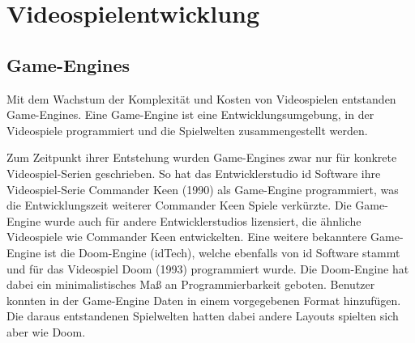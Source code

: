 

\lstset{style=mystyle}

\chapter{Videospielentwicklung}
\label{chap:videospielentwicklung}



\section{Game-Engines}
\label{chap:game engines}

Mit dem Wachstum der Komplexit\"{a}t und Kosten von Videospielen entstanden Game-Engines. Eine Game-Engine ist eine Entwicklungsumgebung, in der Videospiele programmiert und die Spielwelten zusammengestellt werden. 

Zum Zeitpunkt ihrer Entstehung wurden Game-Engines zwar nur f\"{u}r konkrete Videospiel-Serien geschrieben. So hat das Entwicklerstudio id Software ihre Videospiel-Serie Commander Keen (1990) als Game-Engine programmiert, was die Entwicklungszeit weiterer Commander Keen Spiele verk\"{u}rzte. Die Game-Engine wurde auch f\"{u}r andere Entwicklerstudios lizensiert, die \"{a}hnliche Videospiele wie Commander Keen entwickelten. Eine weitere bekanntere Game-Engine ist die Doom-Engine (idTech), welche ebenfalls von id Software stammt und f\"{u}r das Videospiel Doom (1993) programmiert wurde. Die Doom-Engine hat dabei ein minimalistisches Ma\ss{} an Programmierbarkeit geboten. Benutzer konnten in der Game-Engine Daten in einem vorgegebenen Format hinzuf\"{u}gen. Die daraus entstandenen Spielwelten hatten dabei andere Layouts spielten sich aber wie Doom.\autocite{lewis2002game}

